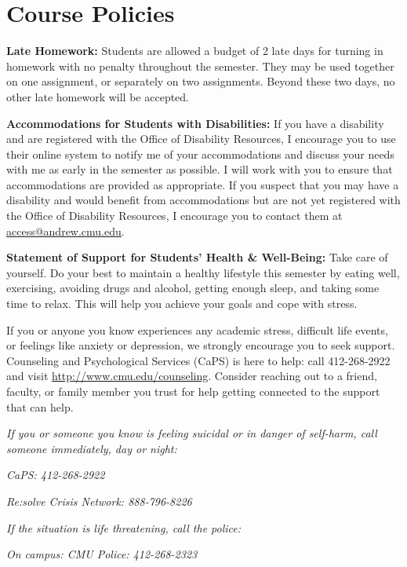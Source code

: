 \documentclass[11pt,letterpaper]{article}
\begin{document}
\section*{Course Policies}

\textbf{Late Homework:} Students are allowed a budget of 2 late days for turning in homework with no penalty throughout the semester. They may be used together on one assignment, or separately on two assignments. Beyond these two days, no other late homework will be accepted.

\medskip
\noindent
\textbf{Accommodations for Students with Disabilities:} If you have a disability and are registered with the Office of Disability Resources, I encourage you to use their online system to notify me of your accommodations and discuss your needs with me as early in the semester as possible. I will work with you to ensure that accommodations are provided as appropriate. If you suspect that you may have a disability and would benefit from accommodations but are not yet registered with the Office of Disability Resources, I encourage you to contact them at \href{mailto:access@andrew.cmu.edu}{access@andrew.cmu.edu}.

\medskip
\noindent
\textbf{Statement of Support for Students' Health \& Well-Being:} Take care of yourself. Do your best to maintain a healthy lifestyle this semester by eating well, exercising, avoiding drugs and alcohol, getting enough sleep, and taking some time to relax. This will help you achieve your goals and cope with stress.

\medskip
\noindent
If you or anyone you know experiences any academic stress, difficult life events, or feelings like anxiety or depression, we strongly encourage you to seek support. Counseling and Psychological Services (CaPS) is here to help: call 412-268-2922 and visit \href{http://www.cmu.edu/counseling}{http://www.cmu.edu/counseling}. Consider reaching out to a friend, faculty, or family member you trust for help getting connected to the support that can help.

\medskip
\noindent
\textit{If you or someone you know is feeling suicidal or in danger of self-harm, call someone immediately, day or night:}

\textit{CaPS: 412-268-2922}

\textit{Re:solve Crisis Network: 888-796-8226}

\medskip
\noindent
\textit{If the situation is life threatening, call the police:}

\textit{On campus: CMU Police: 412-268-2323}
\end{document}
